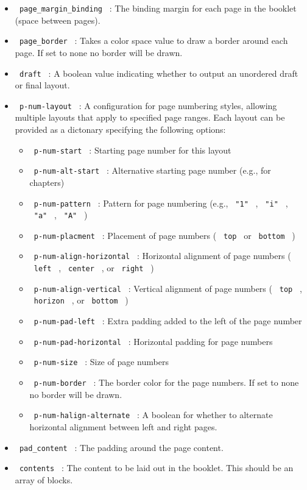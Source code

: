 \begin{itemize}
\tightlist
\item
  \texttt{\ page\_margin\_binding\ } : The binding margin for each page
  in the booklet (space between pages).
\item
  \texttt{\ page\_border\ } : Takes a color space value to draw a border
  around each page. If set to none no border will be drawn.
\item
  \texttt{\ draft\ } : A boolean value indicating whether to output an
  unordered draft or final layout.
\item
  \texttt{\ p-num-layout\ } : A configuration for page numbering styles,
  allowing multiple layouts that apply to specified page ranges. Each
  layout can be provided as a dictonary specifying the following
  options:

  \begin{itemize}
  \tightlist
  \item
    \texttt{\ p-num-start\ } : Starting page number for this layout
  \item
    \texttt{\ p-num-alt-start\ } : Alternative starting page number
    (e.g., for chapters)
  \item
    \texttt{\ p-num-pattern\ } : Pattern for page numbering (e.g.,
    \texttt{\ "1"\ } , \texttt{\ "i"\ } , \texttt{\ "a"\ } ,
    \texttt{\ "A"\ } )
  \item
    \texttt{\ p-num-placment\ } : Placement of page numbers (
    \texttt{\ top\ } or \texttt{\ bottom\ } )
  \item
    \texttt{\ p-num-align-horizontal\ } : Horizontal alignment of page
    numbers ( \texttt{\ left\ } , \texttt{\ center\ } , or
    \texttt{\ right\ } )
  \item
    \texttt{\ p-num-align-vertical\ } : Vertical alignment of page
    numbers ( \texttt{\ top\ } , \texttt{\ horizon\ } , or
    \texttt{\ bottom\ } )
  \item
    \texttt{\ p-num-pad-left\ } : Extra padding added to the left of the
    page number
  \item
    \texttt{\ p-num-pad-horizontal\ } : Horizontal padding for page
    numbers
  \item
    \texttt{\ p-num-size\ } : Size of page numbers
  \item
    \texttt{\ p-num-border\ } : The border color for the page numbers.
    If set to none no border will be drawn.
  \item
    \texttt{\ p-num-halign-alternate\ } : A boolean for whether to
    alternate horizontal alignment between left and right pages.
  \end{itemize}
\item
  \texttt{\ pad\_content\ } : The padding around the page content.
\item
  \texttt{\ contents\ } : The content to be laid out in the booklet.
  This should be an array of blocks.
\end{itemize}


